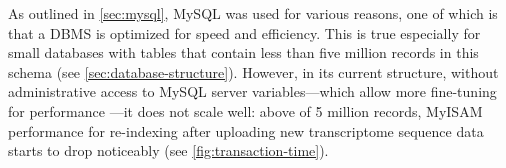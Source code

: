 \label{sec:mysql-performance}
As outlined in \autoref{sec:mysql}, MySQL was used for various reasons, one of
which is that a DBMS is optimized for speed and efficiency. This is true
especially for small databases with tables that contain less than five million
records in this schema (see \autoref{sec:database-structure}). However, in its
current structure, without administrative access to MySQL server
variables---which allow more fine-tuning for performance
\citep{schwartz2012}---it does not scale well: above of 5 million records,
MyISAM performance for re-indexing after uploading new transcriptome sequence
data starts to drop noticeably (see \autoref{fig:transaction-time}). 




